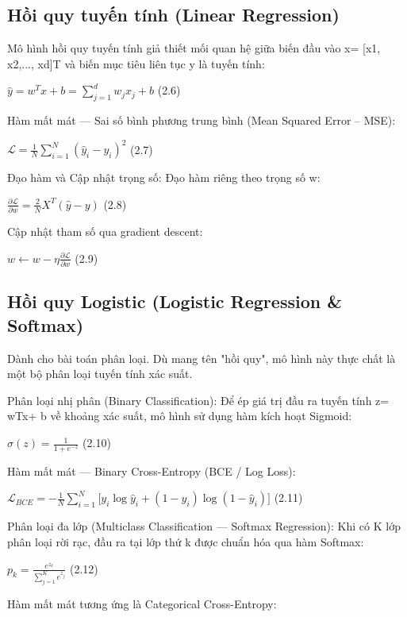 \subsection{Hồi quy tuyến tính (Linear Regression)}\label{hux1ed3i-quy-tuyux1ebfn-tuxednh-linear-regression}

Mô hình hồi quy tuyến tính giả thiết mối quan hệ giữa biến đầu vào x=
{[}x1, x2,..., xd{]}T và biến mục tiêu liên tục y là tuyến tính:

\(\hat{y} = w^{T}x + b = \sum_{j = 1}^{d}w_{j}x_{j} + b\) (2.6)

Hàm mất mát --- Sai số bình phương trung bình (Mean Squared Error --
MSE):

\(\mathcal{L} = \frac{1}{N}\sum_{i = 1}^{N}({\hat{y}}_{i} - y_{i})^{2}\)
(2.7)

Đạo hàm và Cập nhật trọng số: Đạo hàm riêng theo trọng số w:

\(\frac{\partial\mathcal{L}}{\partial w} = \frac{2}{N}X^{T}(\hat{y} - y)\)
(2.8)

Cập nhật tham số qua gradient descent:

\(w \leftarrow w - \eta\frac{\partial\mathcal{L}}{\partial w}\) (2.9)

\subsection{Hồi quy Logistic (Logistic Regression \& Softmax)}\label{hux1ed3i-quy-logistic-logistic-regression-softmax}

Dành cho bài toán phân loại. Dù mang tên "hồi quy", mô hình này thực
chất là một bộ phân loại tuyến tính xác suất.

Phân loại nhị phân (Binary Classification): Để ép giá trị đầu ra tuyến
tính z= wTx+ b về khoảng xác suất, mô hình sử dụng hàm kích hoạt
Sigmoid:

\(\sigma(z) = \frac{1}{1 + e^{- z}}\) (2.10)

Hàm mất mát --- Binary Cross-Entropy (BCE / Log Loss):

\(\mathcal{L}_{BCE} = - \frac{1}{N}\sum_{i = 1}^{N}\lbrack y_{i}\log{\hat{y}}_{i} + (1 - y_{i})\log(1 - {\hat{y}}_{i})\rbrack\)
(2.11)

Phân loại đa lớp (Multiclass Classification --- Softmax Regression): Khi
có K lớp phân loại rời rạc, đầu ra tại lớp thứ k được chuẩn hóa qua hàm
Softmax:

\(p_{k} = \frac{e^{z_{k}}}{\sum_{j = 1}^{K}e^{z_{j}}}\) (2.12)

Hàm mất mát tương ứng là Categorical Cross-Entropy:

